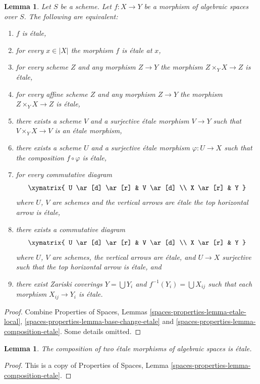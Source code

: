 \documentclass{stacks-project}
\theoremstyle{plain}
\newtheorem{lemma}[subsection]{Lemma}
\theoremstyle{definition}
\theoremstyle{remark}
\numberwithin{equation}{subsection}
\begin{document}
\begin{lemma}
\label{lemma-etale-local}
Let $S$ be a scheme.
Let $f : X \to Y$ be a morphism of algebraic spaces over $S$.
The following are equivalent:
\begin{enumerate}
\item $f$ is \'etale,
\item for every $x \in |X|$ the morphism $f$ is \'etale at $x$,
\item for every scheme $Z$ and any morphism $Z \to Y$ the morphism
$Z \times_Y X \to Z$ is \'etale,
\item for every affine scheme $Z$ and any morphism
$Z \to Y$ the morphism $Z \times_Y X \to Z$ is \'etale,
\item there exists a scheme $V$ and a surjective \'etale morphism
$V \to Y$ such that $V \times_Y X \to V$ is an \'etale morphism,
\item there exists a scheme $U$ and a surjective \'etale morphism
$\varphi : U \to X$ such that the composition $f \circ \varphi$
is \'etale,
\item for every commutative diagram
$$
\xymatrix{
U \ar[d] \ar[r] & V \ar[d] \\
X \ar[r] & Y
}
$$
where $U$, $V$ are schemes and the vertical arrows are \'etale
the top horizontal arrow is \'etale,
\item there exists a commutative diagram
$$
\xymatrix{
U \ar[d] \ar[r] & V \ar[d] \\
X \ar[r] & Y
}
$$
where $U$, $V$ are schemes, the vertical arrows are \'etale, and
$U \to X$ surjective such that the top horizontal arrow is \'etale, and
\item there exist Zariski coverings $Y = \bigcup Y_i$ and
$f^{-1}(Y_i) = \bigcup X_{ij}$ such that each morphism
$X_{ij} \to Y_i$ is \'etale.
\end{enumerate}
\end{lemma}

\begin{proof}
Combine
Properties of Spaces, Lemmas
\ref{spaces-properties-lemma-etale-local},
\ref{spaces-properties-lemma-base-change-etale} and
\ref{spaces-properties-lemma-composition-etale}.
Some details omitted.
\end{proof}

\begin{lemma}
\label{lemma-composition-etale}
The composition of two \'etale morphisms of algebraic spaces
is \'etale.
\end{lemma}

\begin{proof}
This is a copy of
Properties of Spaces, Lemma \ref{spaces-properties-lemma-composition-etale}.
\end{proof}
\end{document}
